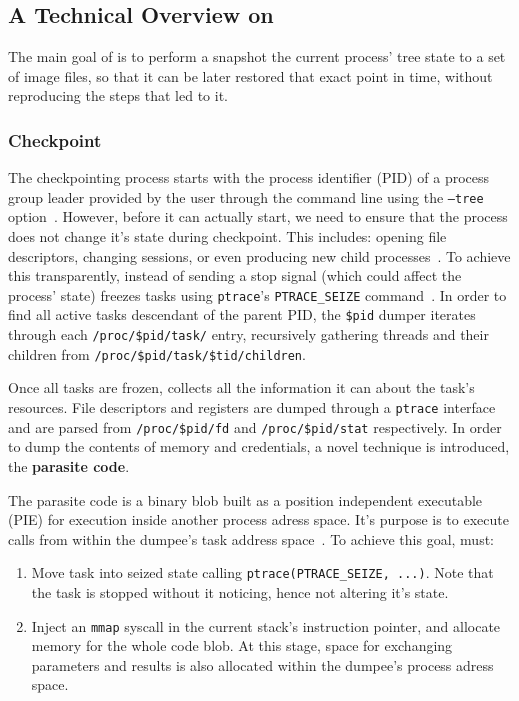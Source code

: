 \subsection{A Technical Overview on \criu}

The main goal of \criu is to perform a snapshot the current process' tree state to a set of image files, so that it can be later restored that exact point in time, without reproducing the steps that led to it.

\subsubsection*{Checkpoint}

The checkpointing process starts with the process identifier (PID) of a process group leader provided by the user through the command line using the \texttt{--tree} option~\cite{criu-checkpoint}.
However, before it can actually start, we need to ensure that the process does not change it's state during checkpoint.
This includes: opening file descriptors, changing sessions, or even producing new child processes~\cite{criu-feeze}.
To achieve this transparently, instead of sending a stop signal (which could affect the process' state) \criu freezes tasks using \texttt{ptrace}'s \texttt{PTRACE\_SEIZE} command~\cite{ptrace-manpage}.
In order to find all active tasks descendant of the parent PID, the \texttt{\$pid} dumper iterates through each \texttt{/proc/\$pid/task/} entry, recursively gathering threads and their children from \texttt{/proc/\$pid/task/\$tid/children}.

Once all tasks are frozen, \criu collects all the information it can about the task's resources.
File descriptors and registers are dumped through a \texttt{ptrace} interface and are parsed from \texttt{/proc/\$pid/fd} and \texttt{/proc/\$pid/stat} respectively.
In order to dump the contents of memory and credentials, a novel technique is introduced, the \textbf{parasite code}.

The parasite code is a binary blob built as a position independent executable (PIE) for execution inside another process adress space.
It's purpose is to execute \criu calls from within the dumpee's task address space~\cite{criu-parasite}.
To achieve this goal, \criu must:
\begin{enumerate}
    \item Move task into seized state calling \texttt{ptrace(PTRACE\_SEIZE, ...)}. Note that the task is stopped without it noticing, hence not altering it's state.
    \item Inject an \texttt{mmap} syscall in the current stack's instruction pointer, and allocate memory for the whole code blob. At this stage, space for exchanging parameters and results is also allocated within the dumpee's process adress space.
\end{enumerate}

